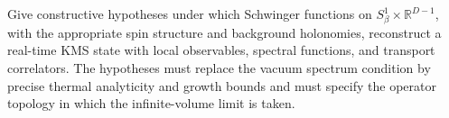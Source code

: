 \begin{openproblem}
\label{op:euclidean-thermal-reconstruction}
Give constructive hypotheses under which Schwinger functions on
\(S^1_\beta\times\mathbb R^{D-1}\), with the appropriate spin structure and
background holonomies, reconstruct a real-time KMS state with local
observables, spectral functions, and transport correlators.  The hypotheses
must replace the vacuum spectrum condition by precise thermal analyticity and
growth bounds and must specify the operator topology in which the
infinite-volume limit is taken.
\end{openproblem}
